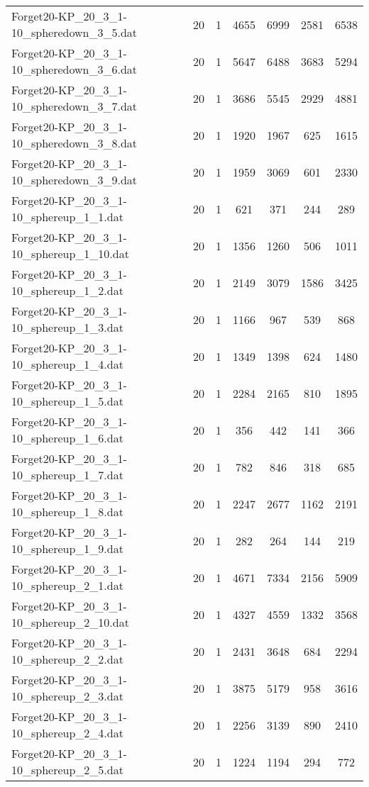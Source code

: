 \begin{table}[!ht]
\begin{tabular}{lcccccc}
Forget20-KP\_20\_3\_1-10\_spheredown\_3\_5.dat & 20 & 1 & 4655 & 6999 & 2581 & 6538 \\
Forget20-KP\_20\_3\_1-10\_spheredown\_3\_6.dat & 20 & 1 & 5647 & 6488 & 3683 & 5294 \\
Forget20-KP\_20\_3\_1-10\_spheredown\_3\_7.dat & 20 & 1 & 3686 & 5545 & 2929 & 4881 \\
Forget20-KP\_20\_3\_1-10\_spheredown\_3\_8.dat & 20 & 1 & 1920 & 1967 & 625 & 1615 \\
Forget20-KP\_20\_3\_1-10\_spheredown\_3\_9.dat & 20 & 1 & 1959 & 3069 & 601 & 2330 \\
Forget20-KP\_20\_3\_1-10\_sphereup\_1\_1.dat & 20 & 1 & 621 & 371 & 244 & 289 \\
Forget20-KP\_20\_3\_1-10\_sphereup\_1\_10.dat & 20 & 1 & 1356 & 1260 & 506 & 1011 \\
Forget20-KP\_20\_3\_1-10\_sphereup\_1\_2.dat & 20 & 1 & 2149 & 3079 & 1586 & 3425 \\
Forget20-KP\_20\_3\_1-10\_sphereup\_1\_3.dat & 20 & 1 & 1166 & 967 & 539 & 868 \\
Forget20-KP\_20\_3\_1-10\_sphereup\_1\_4.dat & 20 & 1 & 1349 & 1398 & 624 & 1480 \\
Forget20-KP\_20\_3\_1-10\_sphereup\_1\_5.dat & 20 & 1 & 2284 & 2165 & 810 & 1895 \\
Forget20-KP\_20\_3\_1-10\_sphereup\_1\_6.dat & 20 & 1 & 356 & 442 & 141 & 366 \\
Forget20-KP\_20\_3\_1-10\_sphereup\_1\_7.dat & 20 & 1 & 782 & 846 & 318 & 685 \\
Forget20-KP\_20\_3\_1-10\_sphereup\_1\_8.dat & 20 & 1 & 2247 & 2677 & 1162 & 2191 \\
Forget20-KP\_20\_3\_1-10\_sphereup\_1\_9.dat & 20 & 1 & 282 & 264 & 144 & 219 \\
Forget20-KP\_20\_3\_1-10\_sphereup\_2\_1.dat & 20 & 1 & 4671 & 7334 & 2156 & 5909 \\
Forget20-KP\_20\_3\_1-10\_sphereup\_2\_10.dat & 20 & 1 & 4327 & 4559 & 1332 & 3568 \\
Forget20-KP\_20\_3\_1-10\_sphereup\_2\_2.dat & 20 & 1 & 2431 & 3648 & 684 & 2294 \\
Forget20-KP\_20\_3\_1-10\_sphereup\_2\_3.dat & 20 & 1 & 3875 & 5179 & 958 & 3616 \\
Forget20-KP\_20\_3\_1-10\_sphereup\_2\_4.dat & 20 & 1 & 2256 & 3139 & 890 & 2410 \\
Forget20-KP\_20\_3\_1-10\_sphereup\_2\_5.dat & 20 & 1 & 1224 & 1194 & 294 & 772 \\

\end{tabular}
\end{table}
